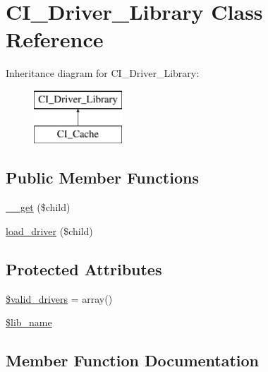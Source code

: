 \hypertarget{class_c_i___driver___library}{}\section{C\+I\+\_\+\+Driver\+\_\+\+Library Class Reference}
\label{class_c_i___driver___library}
Inheritance diagram for C\+I\+\_\+\+Driver\+\_\+\+Library\+:\begin{figure}[H]
\begin{center}
\leavevmode
\includegraphics[height=2.000000cm]{class_c_i___driver___library}
\end{center}
\end{figure}
\subsection*{Public Member Functions}
\begin{DoxyCompactItemize}
\item 
\mbox{\hyperlink{class_c_i___driver___library_a2fac4d4694e05e7eeba5282bd6ff8caf}{\+\_\+\+\_\+get}} (\$child)
\item 
\mbox{\hyperlink{class_c_i___driver___library_a7cc2908487e106164664ef7d743690b8}{load\+\_\+driver}} (\$child)
\end{DoxyCompactItemize}
\subsection*{Protected Attributes}
\begin{DoxyCompactItemize}
\item 
\mbox{\hyperlink{class_c_i___driver___library_a32d963b3d49fd67f188c1a74d38be6df}{\$valid\+\_\+drivers}} = array()
\item 
\mbox{\hyperlink{class_c_i___driver___library_ab820c27413d5904686c58f6b2941b603}{\$lib\+\_\+name}}
\end{DoxyCompactItemize}


\subsection{Member Function Documentation}
\mbox{\label{class_c_i___driver___library_a2fac4d4694e05e7eeba5282bd6ff8caf}} 
